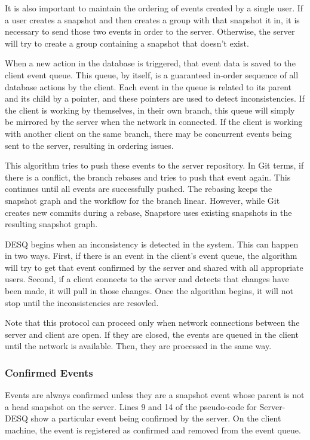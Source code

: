 It is also important to maintain the ordering of events created by a single user. If a user creates a snapshot and then creates a group with that snapshot it in, it is necessary to send those two events in order to the server. Otherwise, the server will try to create a group containing a snapshot that doesn't exist.

When a new action in the database is triggered, that event data is saved to the client event queue. This queue, by itself, is a guaranteed in-order sequence of all database actions by the client. Each event in the queue is related to its parent and its child by a pointer, and these pointers are used to detect inconsistencies. If the client is working by themselves, in their own branch, this queue will simply be mirrored by the server when the network in connected. If the client is working with another client on the same branch, there may be concurrent events being sent to the server, resulting in ordering issues.

This algorithm tries to push these events to the server repository. In Git terms, if there is a conflict, the branch rebases and tries to push that event again. This continues until all events are successfully pushed. The rebasing keeps the snapshot graph and the workflow for the branch linear. However, while Git creates new commits during a rebase, Snapstore uses existing snapshots in the resulting snapshot graph.

DESQ begins when an inconsistency is detected in the system. This can happen in two ways. First, if there is an event in the client's event queue, the algorithm will try to get that event confirmed by the server and shared with all appropriate users. Second, if a client connects to the server and detects that changes have been made, it will pull in those changes. Once the algorithm begins, it will not stop until the inconsistencies are resovled. 

Note that this protocol can proceed only when network connections between the server and client are open. If they are closed, the events are queued in the client until the network is available. Then, they are processed in the same way.

\subsubsection{Confirmed Events}

Events are always confirmed unless they are a snapshot event whose parent is not a head snapshot on the server. Lines 9 and 14 of the pseudo-code for Server-DESQ show a particular event being confirmed by the server. On the client machine, the event is registered as confirmed and removed from the event queue.

